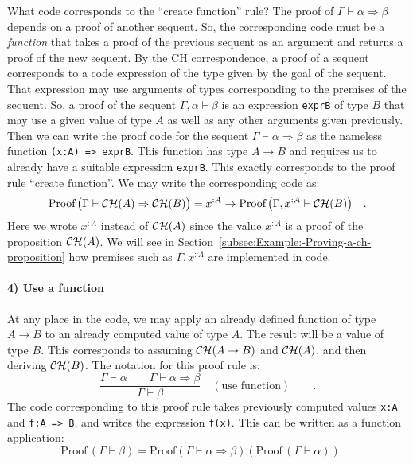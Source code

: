 What code corresponds to the \textsf{``}$\text{create function}$\textsf{''} rule?
The proof of $\Gamma\vdash\alpha\Rightarrow\beta$ depends on a proof
of another sequent. So, the corresponding code must be a \emph{function}
that takes a proof of the previous sequent as an argument and returns
a proof of the new sequent. By the CH correspondence, a proof of a
sequent corresponds to a code expression of the type given by the
goal of the sequent. That expression may use arguments of types corresponding
to the premises of the sequent. So, a proof of the sequent $\Gamma,\alpha\vdash\beta$
is an expression \lstinline!exprB! of type $B$ that may use a given
value of type $A$ as well as any other arguments given previously.
Then we can write the proof code for the sequent $\Gamma\vdash\alpha\Rightarrow\beta$
as the nameless function \lstinline!(x:A) => exprB!. This function
has type $A\rightarrow B$ and requires us to already have a suitable
expression \lstinline!exprB!. This exactly corresponds to the proof
rule \textsf{``}$\text{create function}$\textsf{''}. We may write the corresponding
code as:
\[
\text{Proof}\,\big(\Gamma\vdash{\cal CH}(A)\Rightarrow{\cal CH}(B)\big)=x^{:A}\rightarrow\text{Proof}\,\big(\Gamma,x^{:A}\vdash{\cal CH}(B)\big)\quad.
\]
Here we wrote $x^{:A}$ instead of ${\cal CH}(A)$ since the value
$x^{:A}$ is a proof of the proposition ${\cal CH}(A)$. We will see
in Section~\ref{subsec:Example:-Proving-a-ch-proposition} how premises
such as $\Gamma,x^{:A}$ are implemented in code.

\paragraph{4) Use a function}

At any place in the code, we may apply an already defined function
of type $A\rightarrow B$ to an already computed value of type $A$.
The result will be a value of type $B$. This corresponds to assuming
${\cal CH}(A\rightarrow B)$ and ${\cal CH}(A)$, and then deriving
${\cal CH}(B)$. The notation for this proof rule is:
\[
\frac{\Gamma\vdash\alpha\quad\quad\Gamma\vdash\alpha\Rightarrow\beta}{\Gamma\vdash\beta}\quad(\text{use function})\quad\quad.
\]
The code corresponding to this proof rule takes previously computed
values \lstinline!x:A! and \lstinline!f:A => B!, and writes the
expression \lstinline!f(x)!. This can be written as a function application:
\[
\text{Proof}\,(\Gamma\vdash\beta)=\text{Proof}\left(\Gamma\vdash\alpha\Rightarrow\beta\right)(\text{Proof}\,(\Gamma\vdash\alpha))\quad.
\]


